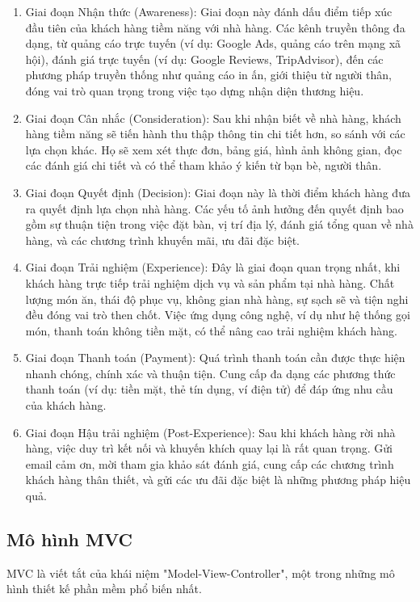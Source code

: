 \begin{enumerate}
    \item Giai đoạn Nhận thức (Awareness): Giai đoạn này đánh dấu điểm tiếp xúc đầu tiên của khách hàng tiềm năng với nhà hàng. Các kênh truyền thông đa dạng, từ quảng cáo trực tuyến (ví dụ: Google Ads, quảng cáo trên mạng xã hội), đánh giá trực tuyến (ví dụ: Google Reviews, TripAdvisor), đến các phương pháp truyền thống như quảng cáo in ấn, giới thiệu từ người thân, đóng vai trò quan trọng trong việc tạo dựng nhận diện thương hiệu.
    \item Giai đoạn Cân nhắc (Consideration): Sau khi nhận biết về nhà hàng, khách hàng tiềm năng sẽ tiến hành thu thập thông tin chi tiết hơn, so sánh với các lựa chọn khác. Họ sẽ xem xét thực đơn, bảng giá, hình ảnh không gian, đọc các đánh giá chi tiết và có thể tham khảo ý kiến từ bạn bè, người thân.
    \item Giai đoạn Quyết định (Decision): Giai đoạn này là thời điểm khách hàng đưa ra quyết định lựa chọn nhà hàng. Các yếu tố ảnh hưởng đến quyết định bao gồm sự thuận tiện trong việc đặt bàn, vị trí địa lý, đánh giá tổng quan về nhà hàng, và các chương trình khuyến mãi, ưu đãi đặc biệt.
    \item Giai đoạn Trải nghiệm (Experience): Đây là giai đoạn quan trọng nhất, khi khách hàng trực tiếp trải nghiệm dịch vụ và sản phẩm tại nhà hàng. Chất lượng món ăn, thái độ phục vụ, không gian nhà hàng, sự sạch sẽ và tiện nghi đều đóng vai trò then chốt. Việc ứng dụng công nghệ, ví dụ như hệ thống gọi món, thanh toán không tiền mặt, có thể nâng cao trải nghiệm khách hàng.
    \item Giai đoạn Thanh toán (Payment): Quá trình thanh toán cần được thực hiện nhanh chóng, chính xác và thuận tiện. Cung cấp đa dạng các phương thức thanh toán (ví dụ: tiền mặt, thẻ tín dụng, ví điện tử) để đáp ứng nhu cầu của khách hàng.
    \item Giai đoạn Hậu trải nghiệm (Post-Experience): Sau khi khách hàng rời nhà hàng, việc duy trì kết nối và khuyến khích quay lại là rất quan trọng. Gửi email cảm ơn, mời tham gia khảo sát đánh giá, cung cấp các chương trình khách hàng thân thiết, và gửi các ưu đãi đặc biệt là những phương pháp hiệu quả.
\end{enumerate}

\subsection{Mô hình MVC}
MVC là viết tắt của khái niệm "Model-View-Controller", một trong những mô hình thiết kế phần mềm phổ biến nhất.\\

